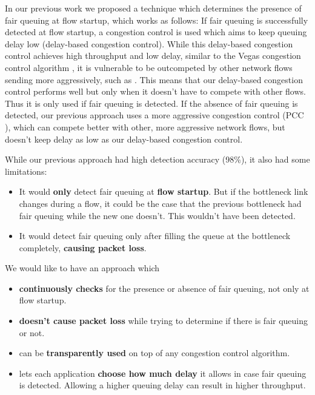 \documentclass[conference]{IEEEtran}
\begin{document}
In our previous work we proposed a technique which determines the presence of fair queuing at flow startup, which works as follows: 
If fair queuing is successfully detected at flow startup, a congestion control is used which aims to keep queuing delay low (delay-based congestion control). 
While this delay-based congestion control achieves high throughput and low delay, similar to the Vegas congestion control algorithm \cite{brakmo_tcp_1995}, 
it is vulnerable to be outcompeted by other network flows sending more aggressively, such as \cite{cardwell_bbr_2016,dong_pcc_2015,ha_cubic_2008}.
This means that our delay-based congestion control performs well but only when it doesn't have to compete with other flows. Thus it is only used if fair queuing is detected. 
If the absence of fair queuing is detected, our previous approach uses a more aggressive congestion control (PCC \cite{dong_pcc_2015}), which can compete better with other, more aggressive network flows,
but doesn't keep delay as low as our delay-based congestion control. 

While our previous approach had high detection accuracy (98\%), it also had some limitations:
\begin{itemize}
    \item It would \textbf{only} detect fair queuing at \textbf{flow startup}. 
    But if the bottleneck link changes during a flow, it could be the case that the previous bottleneck had fair queuing while the new one doesn't. This wouldn't have been detected. 
    \item It would detect fair queuing only after filling the queue at the bottleneck completely, \textbf{causing packet loss}. 
\end{itemize}

We would like to have an approach which 
\begin{itemize}
    \item \textbf{continuously checks} for the presence or absence of fair queuing, not only at flow startup. 
    \item \textbf{doesn't cause packet loss} while trying to determine if there is fair queuing or not. 
    \item can be \textbf{transparently used} on top of any congestion control algorithm. 
    \item lets each application \textbf{choose how much delay} it allows in case fair queuing is detected. Allowing a higher queuing delay can result in higher throughput. 
\end{itemize} 
\end{document}

